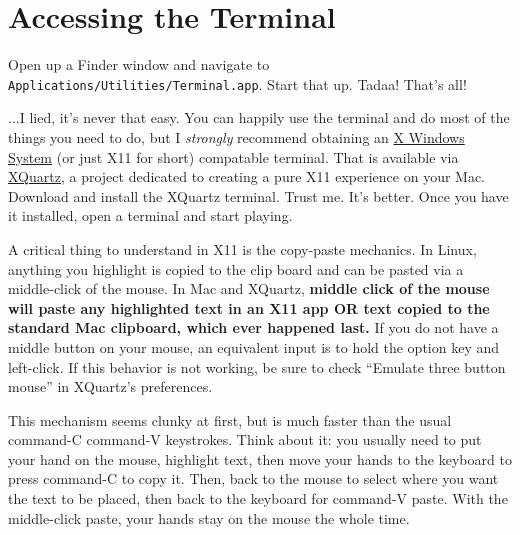 \documentclass[12pt, letterpaper]{article}
\begin{document}
\section{Accessing the Terminal}
Open up a Finder window and navigate to
{\tt Applications/Utilities/Terminal.app}.  Start that up.  Tadaa!  That's all!

...I lied, it's never that easy.  You can happily use the terminal and do
most of the things you need to do, but I \emph{strongly} recommend obtaining
an \href{https://en.wikipedia.org/wiki/X_Window_System}{X Windows System}
(or just X11 for short) compatable terminal.  That is available via
\href{http://www.xquartz.org/}{XQuartz}, a project dedicated to creating a
pure X11 experience on your Mac.  Download and install the XQuartz terminal.
Trust me.  It's better.  Once you have it installed, open a terminal and
start playing.

A critical thing to understand in X11 is the copy-paste mechanics. In Linux,
anything you highlight is copied to the clip board and can be pasted
via a middle-click of the mouse.  In Mac and XQuartz, \textbf{middle click
  of the mouse will paste any highlighted text in an X11 app OR text copied
  to the standard Mac clipboard, which ever happened last.}  If you do not
have a middle button on your mouse, an equivalent input is to hold the option
key and left-click.  If this behavior
is not working, be sure to check ``Emulate three button mouse'' in
XQuartz's preferences.

This mechanism seems clunky at first, but is much
faster than the usual command-C command-V keystrokes.  Think about it:
you usually need to put your hand on the mouse, highlight text, then move
your hands to the keyboard to press command-C to copy it.  Then, back to the
mouse to select where you want the text to be placed, then back to the
keyboard for command-V paste.  With the middle-click paste, your hands stay on
the mouse the whole time.
\end{document}
